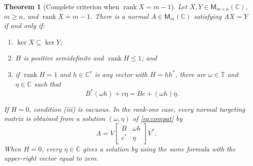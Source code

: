 \documentclass[11pt]{article}
\newtheorem{theorem}{Theorem}
\newcommand{\C}{\mathbb C}
\newcommand{\M}{\mathsf M}
\newcommand{\T}{\mathbb T}
\newcommand{\rank}{\operatorname{rank}}
\begin{document}
\begin{theorem}[Complete criterion when $\rank X=m-1$]\label{thm:main}
Let $X,Y\in\M_{m\times n}(\C)$, $m\ge n$, and $\rank X=m-1$.
There is a normal $A\in\M_m(\C)$ satisfying $AX=Y$ if and only if:
\begin{enumerate}[label=\textup{(\roman*)}]
\item $\ker X\subseteq\ker Y$;
\item $H$ is positive semidefinite and $\rank H\le1$; and
\item if $\rank H=1$ and $h\in\C^r$ is any vector with $H=hh^*$,
there are $\omega\in\T$ and $\eta\in\C$ such that
\begin{equation}\label{eq:compat}
 B^*(\omega h)+c\eta=Bc+(\omega h)\overline\eta.
\end{equation}
\end{enumerate}
If $H=0$, condition \textup{(iii)} is vacuous.  In the rank-one case, every
normal targeting matrix is obtained from a solution $(\omega,\eta)$ of
\eqref{eq:compat} by
\begin{equation}\label{eq:construction}
 A=V\begin{bmatrix}B&\omega h\\c^*&\eta\end{bmatrix}V^*.
\end{equation}
When $H=0$, every $\eta\in\C$ gives a solution by using the same formula with
the upper-right vector equal to zero.
\end{theorem}
\end{document}
